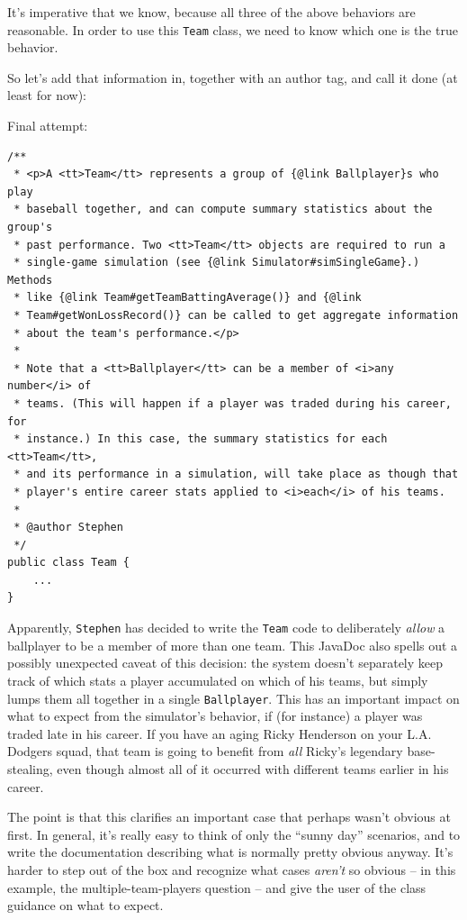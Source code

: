 It's imperative that we know, because all three of the above behaviors are
reasonable. In order to use this \texttt{Team} class, we need to know which
one is the true behavior.

So let's add that information in, together with an author tag, and call it
done (at least for now):

\pagebreak
Final attempt:
\vspace{-.15in}
\begin{Verbatim}[fontsize=\footnotesize,samepage=true,frame=single]
/**
 * <p>A <tt>Team</tt> represents a group of {@link Ballplayer}s who play
 * baseball together, and can compute summary statistics about the group's
 * past performance. Two <tt>Team</tt> objects are required to run a
 * single-game simulation (see {@link Simulator#simSingleGame}.) Methods
 * like {@link Team#getTeamBattingAverage()} and {@link 
 * Team#getWonLossRecord()} can be called to get aggregate information
 * about the team's performance.</p>
 * 
 * Note that a <tt>Ballplayer</tt> can be a member of <i>any number</i> of
 * teams. (This will happen if a player was traded during his career, for
 * instance.) In this case, the summary statistics for each <tt>Team</tt>, 
 * and its performance in a simulation, will take place as though that
 * player's entire career stats applied to <i>each</i> of his teams.
 *
 * @author Stephen
 */
public class Team {
    ...
}
\end{Verbatim}

Apparently, \texttt{Stephen} has decided to write the \texttt{Team} code to
deliberately \textit{allow} a ballplayer to be a member of more than one team.
This JavaDoc also spells out a possibly unexpected caveat of this decision:
the system doesn't separately keep track of which stats a player accumulated
on which of his teams, but simply lumps them all together in a single
\texttt{Ballplayer}. This has an important impact on what to expect from the
simulator's behavior, if (for instance) a player was traded late in his
career. If you have an aging Ricky Henderson on your L.A. Dodgers squad, that
team is going to benefit from \textit{all} Ricky's legendary base-stealing,
even though almost all of it occurred with different teams earlier in his
career.

The point is that this clarifies an important case that perhaps wasn't obvious
at first. In general, it's really easy to think of only the ``sunny day''
scenarios, and to write the documentation describing what is normally pretty
obvious anyway. It's harder to step out of the box and recognize what cases
\textit{aren't} so obvious -- in this example, the multiple-team-players
question -- and give the user of the class guidance on what to expect.


